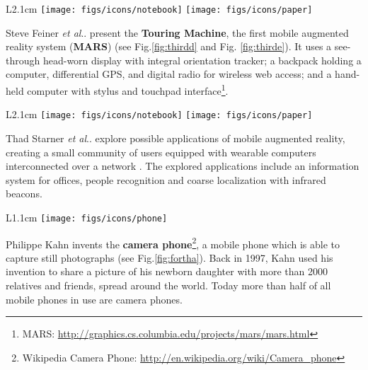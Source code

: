 \documentclass[12pt,a4paper]{article}
\makeatletter
\DeclareRobustCommand\onedot{\futurelet\@let@token\@onedot}
\def\@onedot{\ifx\@let@token.\else.\null\fi\xspace}
\def\etal{\emph{et al}\onedot}
\makeatother
\begin{document}
\begin{wrapfigure}{L}{2.1cm}
	\vspace{-10pt}	
	\texttt{[image: figs/icons/notebook]}
	\texttt{[image: figs/icons/paper]}	
	\vspace{-20pt}		
\end{wrapfigure}
\noindent Steve Feiner \etal present the \textbf{Touring Machine}, the first mobile augmented reality system (\textbf{MARS}) \cite{Feiner97} (see Fig.\ref{fig:thirdd} and Fig. \ref{fig:thirde}). It uses a see-through head-worn display with integral orientation tracker; a backpack holding a computer, differential GPS, and digital radio for wireless web access; and a hand-held computer with stylus and touchpad interface\footnote{MARS: \url{http://graphics.cs.columbia.edu/projects/mars/mars.html}}.

\vspace{0.1in} 

\begin{wrapfigure}{L}{2.1cm}
	\vspace{0pt}	
	\texttt{[image: figs/icons/notebook]}
	\texttt{[image: figs/icons/paper]}	
	\vspace{-20pt}		
\end{wrapfigure}
\noindent Thad Starner \etal explore possible applications of mobile augmented reality, creating a small community of users equipped with wearable computers interconnected over a network \cite{Starner97}. The explored applications include an information system for offices, people recognition and coarse localization with infrared beacons.

\vspace{0.1in}

\begin{wrapfigure}{L}{1.1cm}
	\vspace{-10pt}	
	\texttt{[image: figs/icons/phone]}
	\vspace{-20pt}		
\end{wrapfigure}
\noindent Philippe Kahn invents the \textbf{camera phone}\footnote{Wikipedia Camera Phone: \url{http://en.wikipedia.org/wiki/Camera_phone}}, a mobile phone which is able to capture still photographs (see Fig.\ref{fig:fortha}). Back in 1997, Kahn used his invention to share a picture of his newborn daughter with more than 2000 relatives and friends, spread around the world. Today more than half of all mobile phones in use are camera phones.

\vspace{0.1in}
\end{document}
